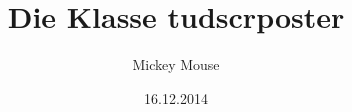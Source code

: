 \documentclass[ngerman,
]%
{tudscrreprtnew}
\begin{document}
\date{16.12.2014}
\author{Mickey Mouse}
\title{Die Klasse tudscrposter}



\blindtext
\end{document}
